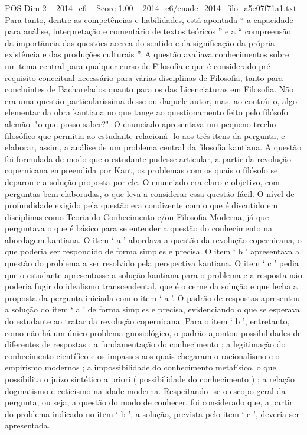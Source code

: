 \begin{textsample}{POS Dim 2 – 2014\_c6 – Score 1.00 – 2014\_c6/enade\_2014\_filo\_a5e07f71a1.txt}
Para tanto, dentre as competências e habilidades, está apontada “ a capacidade para análise, interpretação e comentário de textos teóricos ” e a “ compreensão da importância das questões acerca do sentido e da significação da própria existência e das produções culturais ”.
A questão avaliava conhecimentos sobre um tema central para qualquer curso de Filosofia e que é considerado pré-requisito conceitual necessário para várias disciplinas de Filosofia, tanto para concluintes de Bacharelados quanto para os das Licenciaturas em Filosofia.
Não era uma questão particularíssima desse ou daquele autor, mas, ao contrário, algo elementar da obra kantiana no que tange ao questionamento feito pelo filósofo alemão :"o que posso saber?".
O enunciado apresentava um pequeno trecho filosófico que permitia ao estudante relacioná -lo aos três itens da pergunta, e elaborar, assim, a análise de um problema central da filosofia kantiana.
A questão foi formulada de modo que o estudante pudesse articular, a partir da revolução copernicana empreendida por Kant, os problemas com os quais o filósofo se deparou e a solução proposta por ele.
O enunciado era claro e objetivo, com perguntas bem elaboradas, o que leva a considerar essa questão fácil.
O nível de profundidade exigido pela questão era condizente com o que é discutido em disciplinas como Teoria do Conhecimento e/ou Filosofia Moderna, já que perguntava o que é básico para se entender a questão do conhecimento na abordagem kantiana.
O item ‘ a ’ abordava a questão da revolução copernicana, o que poderia ser respondido de forma simples e precisa.
O item ‘ b ’ apresentava a questão do problema a ser resolvido pela perspectiva kantiana.
O item ‘ c ’ pedia que o estudante apresentasse a solução kantiana para o problema e a resposta não poderia fugir do idealismo transcendental, que é o cerne da solução e que fecha a proposta da pergunta iniciada com o item ‘ a ’.
O padrão de respostas apresentou a solução do item ‘ a ’ de forma simples e precisa, evidenciando o que se esperava do estudante ao tratar da revolução copernicana.
Para o item ‘ b ’, entretanto, como não há um único problema gnosiológico, o padrão apontou possibilidades de diferentes de respostas : a fundamentação do conhecimento ; a legitimação do conhecimento científico e os impasses aos quais chegaram o racionalismo e o empirismo modernos ; a impossibilidade do conhecimento metafísico, o que possibilita o juízo sintético a priori ( possibilidade do conhecimento ) ; a relação dogmatismo e ceticismo na idade moderna.
Respeitando -se o escopo geral da pergunta, ou seja, a questão do modo de conhecer, foi considerado que, a partir do problema indicado no item ‘ b ’, a solução, prevista pelo item ‘ c ’, deveria ser apresentada.

\end{textsample}
